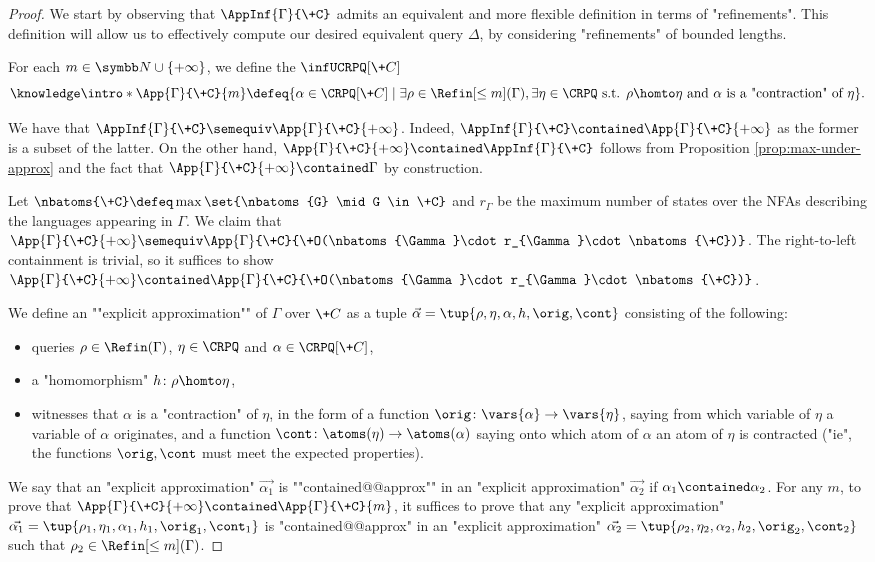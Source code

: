 \begin{proof}
	We start by observing that $\AppInf{\Gamma}{\+C}$ admits an equivalent and more flexible definition in terms of "refinements". This definition will allow us to effectively compute our desired equivalent query $\Delta$, by considering "refinements" of bounded lengths.

	For each $m \in \N\cup\{+\infty\}$, we define the $\infUCRPQ[\+C]$
	\[\AP\intro*\App{\Gamma}{\+C}{m} \defeq \{
		\alpha \in \CRPQ[\+C] \mid \exists \rho \in \Refin[\leq m](\Gamma), 
		\exists \eta \in \CRPQ \text{ s.t. }
		\rho \homto \eta \text{ and } \alpha \text{ is a "contraction" of } \eta
	\}.\]

	We have that $\AppInf{\Gamma}{\+C}\semequiv \App{\Gamma}{\+C}{+\infty}$. Indeed, $\AppInf{\Gamma}{\+C}\contained \App{\Gamma}{\+C}{+\infty}$ as the former is a subset of the latter. On the other hand, $\App{\Gamma}{\+C}{+\infty}\contained \AppInf{\Gamma}{\+C}$ follows from Proposition \ref{prop:max-under-approx} and the fact that $\App{\Gamma}{\+C}{+\infty}\contained \Gamma$ by construction.
	
	Let $\nbatoms{\+C}\defeq \max{\set{\nbatoms{G} \mid G \in \+C}}$ and $r_{\Gamma}$ be the maximum number of states over the NFAs describing the languages appearing in $\Gamma$. 
	We claim that $\App{\Gamma}{\+C}{+\infty} \semequiv \App{\Gamma}{\+C}{\+O(\nbatoms{\Gamma}\cdot r_{\Gamma}\cdot \nbatoms{\+C})}$.
	The right-to-left containment is trivial, so it suffices to show
	$\App{\Gamma}{\+C}{+\infty} \contained \App{\Gamma}{\+C}{\+O(\nbatoms{\Gamma}\cdot r_{\Gamma}\cdot \nbatoms{\+C})}$.

	We define an \AP""explicit approximation"" of $\Gamma$ over $\+C$ as a tuple
	$\vec{\alpha} = \tup{\rho, \eta, \alpha, h, \orig, \cont}$ consisting of the following:
	\begin{itemize}
		\item queries $\rho \in \Refin(\Gamma)$, $\eta \in \CRPQ$ and
			$\alpha \in \CRPQ[\+C]$,
		\item a "homomorphism" $h\colon \rho \homto \eta$,
		\item witnesses that $\alpha$ is a "contraction" of $\eta$, in the form of
			a function $\orig \colon \vars{\alpha} \to \vars{\eta}$,
			saying from which variable of $\eta$ a variable of $\alpha$ originates,
			and a function $\cont \colon \atoms(\eta) \to \atoms(\alpha)$
			saying onto which atom of $\alpha$ an atom of $\eta$ is contracted ("ie", the functions $\orig,\cont$ must meet the expected properties).
	\end{itemize}
	We say that an "explicit approximation" $\vec{\alpha_1}$ is \AP""contained@@approx"" in
	an "explicit approximation" $\vec{\alpha_2}$ if $\alpha_1 \contained \alpha_2$.
	For any $m$, to prove that $\App{\Gamma}{\+C}{+\infty} \contained \App{\Gamma}{\+C}{m}$,
	it suffices to prove that any "explicit approximation" $\vec{\alpha_1}=\tup{\rho_1, \eta_1, \alpha_1, h_1, \orig_1, \cont_1}$ is "contained@@approx"
	in an "explicit approximation" $\vec{\alpha_2}=\tup{\rho_2, \eta_2, \alpha_2, h_2, \orig_2, \cont_2}$ such that $\rho_2 \in \Refin[\leq m](\Gamma)$.


\end{proof}
